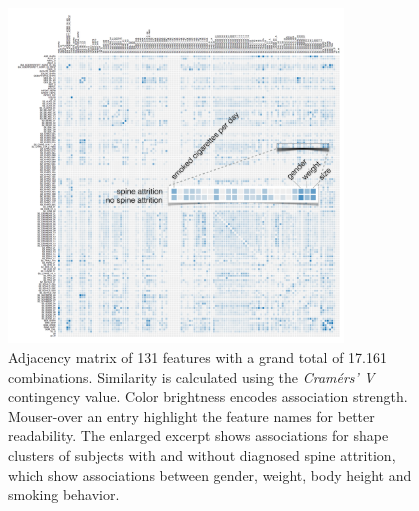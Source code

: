 \documentclass[journal]{style/vgtc} 			          %
\begin{document}

\begin{figure}[htb]
 \centering
 \includegraphics[width=3.5in]{figures/similarity_matrix}
 \caption{Adjacency matrix of 131 features with a grand total of 17.161 combinations.
 Similarity is calculated using the \emph{Cram\'{e}rs' V} contingency value.
 Color brightness encodes association strength.
 Mouser-over an entry highlight the feature names for better readability.
 The enlarged excerpt shows associations for shape clusters of subjects with and without diagnosed spine attrition, which show associations between gender, weight, body height and smoking behavior.
 }
 \label{fig:similarity}
\end{figure}
\end{document}

